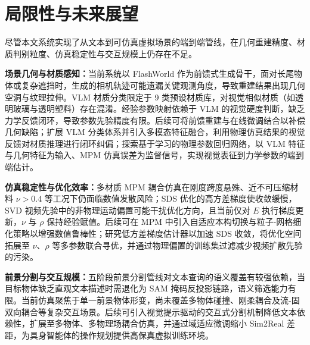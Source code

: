 \section{局限性与未来展望}

尽管本文系统实现了从文本到可仿真虚拟场景的端到端管线，在几何重建精度、材质判别粒度、仿真稳定性与交互规模上仍存在不足。

\textbf{场景几何与材质感知：}当前系统以 FlashWorld 作为前馈式生成骨干，面对长尾物体或复杂遮挡时，生成的相机轨迹可能遗漏关键观测角度，导致重建结果出现几何空洞与纹理拉伸。VLM 材质分类限定于 9 类预设材质库，对视觉相似材质（如透明玻璃与透明塑料）存在混淆。经验参数映射依赖于 VLM 的视觉硬度判断，缺乏力学反馈闭环，导致参数先验精度有限。后续可将前馈重建与在线微调结合以补偿几何缺陷；扩展 VLM 分类体系并引入多模态特征融合，利用物理仿真结果的视觉反馈对材质推理进行闭环纠偏；探索基于学习的物理参数回归网络，以 VLM 特征与几何特征为输入、MPM 仿真误差为监督信号，实现视觉表征到力学参数的端到端估计。

\textbf{仿真稳定性与优化效率：}多材质 MPM 耦合仿真在刚度跨度悬殊、近不可压缩材料 $\nu>0.4$ 等工况下仍面临数值发散风险；SDS 优化的高方差梯度使收敛缓慢，SVD 视频先验中的非物理运动偏置可能干扰优化方向，且当前仅对 $E$ 执行梯度更新，$\nu$ 与 $\rho$ 保持经验赋值。后续可在 MPM 中引入自适应本构切换与粒子-网格细化策略以增强数值鲁棒性；研究低方差梯度估计器以加速 SDS 收敛，将优化空间拓展至 $\nu$、$\rho$ 等多参数联合寻优，并通过物理偏置的训练集过滤减少视频扩散先验的污染。

\textbf{前景分割与交互规模：}五阶段前景分割管线对文本查询的语义覆盖有较强依赖，当目标物体缺乏直观文本描述时需退化为 SAM 掩码反投影链路，语义筛选能力有限。当前仿真聚焦于单一前景物体形变，尚未覆盖多物体碰撞、刚柔耦合及流-固双向耦合等复杂交互场景。后续可引入视觉提示驱动的交互式分割机制降低文本依赖性，扩展至多物体、多物理场耦合仿真，并通过域适应微调缩小 Sim2Real 差距，为具身智能体的操作规划提供高保真虚拟训练环境。

